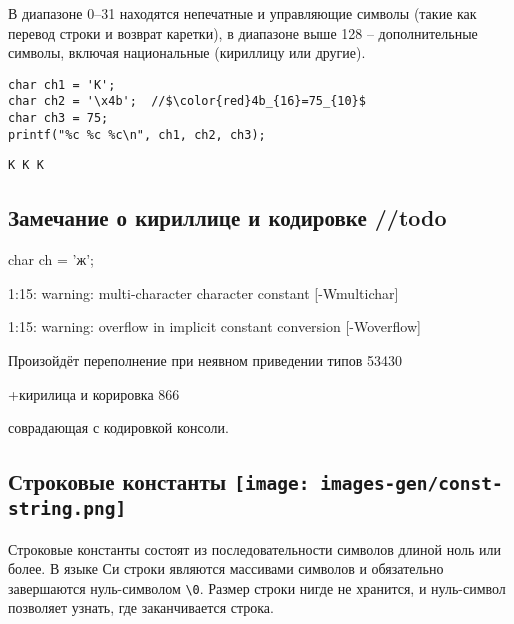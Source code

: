 \documentclass[myc.tex]{subfiles}
\begin{document}
В диапазоне 0--31 находятся непечатные и управляющие символы (такие как перевод строки и возврат каретки), в диапазоне выше 128 -- дополнительные символы, включая национальные (кириллицу или другие).

\begin{lstlisting}
char ch1 = 'K';
char ch2 = '\x4b';  //$\color{red}4b_{16}=75_{10}$
char ch3 = 75;
printf("%c %c %c\n", ch1, ch2, ch3);
\end{lstlisting}
\begin{verbatim}
K K K
\end{verbatim} 






\subsection*{Замечание о кириллице и кодировке //todo}

char ch = 'ж';

1:15: warning: multi-character character constant [-Wmultichar]

1:15: warning: overflow in implicit constant conversion [-Woverflow]


Произойдёт переполнение при неявном приведении типов  53430

+кирилица и корировка 866

соврадающая с кодировкой консоли.





















\subsection[Строковые константы]{Строковые константы \hfill\texttt{[image: images-gen/const-string.png]}}

Строковые константы состоят из последовательности символов длиной ноль или более. В языке Си строки являются массивами символов и обязательно завершаются нуль-символом \texttt{\textbackslash{}0}. Размер строки нигде не хранится, и нуль-символ позволяет узнать, где заканчивается строка.
\end{document}
